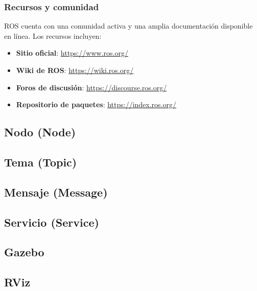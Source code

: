 \subsubsection{Recursos y comunidad}

ROS cuenta con una comunidad activa y una amplia documentación disponible en línea. Los recursos incluyen:

\begin{itemize}
	\item \textbf{Sitio oficial}: \url{https://www.ros.org/}
	\item \textbf{Wiki de ROS}: \url{https://wiki.ros.org/}
	\item \textbf{Foros de discusión}: \url{https://discourse.ros.org/}
	\item \textbf{Repositorio de paquetes}: \url{https://index.ros.org/}
\end{itemize}

\subsection{Nodo (Node)}
\subsection{Tema (Topic)}
\subsection{Mensaje (Message)}
\subsection{Servicio (Service)}
\subsection{Gazebo}
\subsection{RViz}
